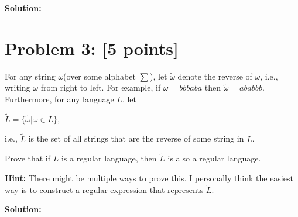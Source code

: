 \documentclass[11pt, letterpaper]{article}
\begin{document}
\vspace{5mm}

\noindent\textbf{Solution:}

\vspace{5mm}

\newpage

\section*{Problem 3: [5 points]}

For any string $\omega$(over some alphabet $\sum$), let $\tilde{\omega}$ denote the reverse of $\omega$, i.e., writing $\omega$ from right to left. For example, if $\omega = bbbaba$ then $\tilde{\omega} = ababbb$. Furthermore, for any language $L$, let

\vspace{5mm}

$\tilde{L} = \{\tilde{\omega}|\omega \in L\},$

\vspace{5mm}

\noindent i.e., $\tilde{L}$ is the set of all strings that are the reverse of some string in $L$.

\vspace{5mm}

\noindent Prove that if $L$ is a regular language, then $\tilde{L}$ is also a regular language.

\vspace{5mm}

\noindent \textbf{Hint:} There might be multiple ways to prove this. I personally think the easiest way is to construct a regular expression that represents $\tilde{L}$.

\vspace{5mm}

\noindent\textbf{Solution:}
\end{document}

